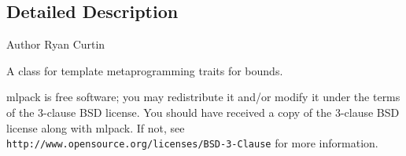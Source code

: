 \subsection{Detailed Description}
\begin{DoxyAuthor}{Author}
Ryan Curtin
\end{DoxyAuthor}
A class for template metaprogramming traits for bounds.

mlpack is free software; you may redistribute it and/or modify it under the terms of the 3-\/clause B\+SD license. You should have received a copy of the 3-\/clause B\+SD license along with mlpack. If not, see {\tt http\+://www.\+opensource.\+org/licenses/\+B\+S\+D-\/3-\/\+Clause} for more information. 